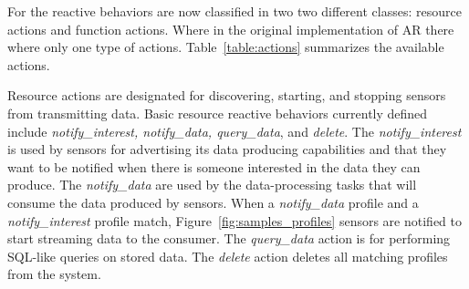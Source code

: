 \begin{table}[t]
\end{table}

For the reactive behaviors are now classified in two two different classes: resource actions and function actions. Where in the original implementation of AR there where only one type of actions. Table~\ref{table:actions} summarizes the available actions.

Resource actions are designated for discovering, starting, and stopping sensors from transmitting data. Basic resource reactive behaviors currently defined include {\it notify\_interest, notify\_data, query\_data}, and {\it delete}. The {\it notify\_interest} is used by sensors for advertising its data producing capabilities and that they want to be notified when there is someone interested in the data they can produce. The {\it notify\_data} are used by the data-processing tasks that will consume the data produced by sensors. When a {\it notify\_data} profile and a {\it notify\_interest} profile match, Figure~\ref{fig:samples_profiles} sensors are notified to start streaming data to the consumer. The {\it query\_data } action is for performing SQL-like queries on stored data. The {\it delete} action deletes all matching profiles from the system.

